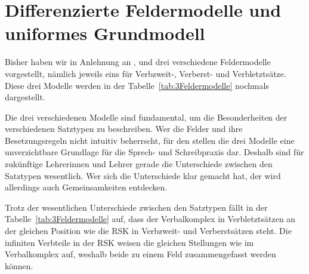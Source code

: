 \section{Differenzierte Feldermodelle und uniformes Grundmodell}\label{section:differenziert_uniform_Feldermodell}

Bisher haben wir in Anlehnung an \citet{Hoehle19862018}, \citet[409, 414]{Eisenberg2020_Satz} und \citet[68--79]{Agel2017} drei verschiedene Feldermodelle vorgestellt, nämlich jeweils eins für Verbzweit-, Verberst- und Verbletztsätze. Diese drei Modelle werden in der Tabelle~\ref{tab:3Feldermodelle} nochmals dargestellt.

\begin{table}
  \centering
  \caption{Differenzmodell: 3 Feldermodelle für 3 Satztypen}
  \label{tab:3Feldermodelle}
\end{table}

Die drei verschiedenen Modelle sind fundamental, um die Besonderheiten der verschiedenen Satztypen zu beschreiben. Wer die Felder und ihre Besetzungsregeln nicht intuitiv beherrscht, für den stellen die drei Modelle eine unverzichtbare Grundlage für die Sprech- und Schreibpraxis dar. Deshalb sind für zukünftige Lehrerinnen und Lehrer gerade die Unterschiede zwischen den Satztypen wesentlich. Wer sich die Unterschiede klar gemacht hat, der wird allerdings auch Gemeinsamkeiten entdecken. 

Trotz der wesentlichen Unterschiede zwischen den Satztypen fällt in der Tabelle~\ref{tab:3Feldermodelle} auf, dass der Verbalkomplex in Verbletztsätzen an der gleichen Position wie die RSK in Verbzweit- und Verberstsätzen steht. Die infiniten Verbteile in der RSK weisen die gleichen Stellungen wie im Verbalkomplex auf, weshalb beide zu einem Feld zusammengefasst werden können. 

